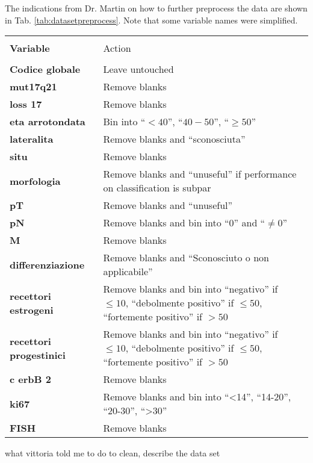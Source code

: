 The indications from Dr. Martin on how to further preprocess the data are shown in Tab. \ref{tab:datasetpreprocess}.
Note that some variable names were simplified.

\begin{table*}[htbp]
\caption{Data set variables}
\begin{center}
\begin{tabular}{l l}
\hline \\
\textbf{Variable} & Action \\
\hline \\
\textbf{Codice globale} & Leave untouched \\
\textbf{mut17q21} & Remove blanks \\
\textbf{loss 17} & Remove blanks \\
\textbf{eta arrotondata} & Bin into \enquote{$< 40$}, \enquote{$40-50$}, \enquote{$\geq 50$}\\
\textbf{lateralita} & Remove blanks and \enquote{sconosciuta} \\
\textbf{situ} & Remove blanks \\
\textbf{morfologia} & Remove blanks and \enquote{unuseful} if performance on classification is subpar \\
\textbf{pT} & Remove blanks and \enquote{unuseful}  \\
\textbf{pN} & Remove blanks and bin into \enquote{0} and \enquote{$\neq0$}\\
\textbf{M} & Remove blanks \\
\textbf{differenziazione} & Remove blanks and \enquote{Sconosciuto o non applicabile} \\
\textbf{recettori estrogeni} & Remove blanks and bin into \enquote{negativo} if $\leq 10$, \enquote{debolmente positivo} if $\leq 50$, \enquote{fortemente positivo} if $> 50$ \\
\textbf{recettori progestinici} & Remove blanks and bin into \enquote{negativo} if $\leq 10$, \enquote{debolmente positivo} if $\leq 50$, \enquote{fortemente positivo} if $> 50$ \\
\textbf{c erbB 2} & Remove blanks \\
\textbf{ki67} & Remove blanks and bin into \enquote{<14}, \enquote{14-20}, \enquote{20-30}, \enquote{>30} \\
\textbf{FISH} & Remove blanks \\
\end{tabular}
\label{tab:datasetpreprocess}
\end{center}
\end{table*}

what vittoria told me to do to clean, describe the data set


